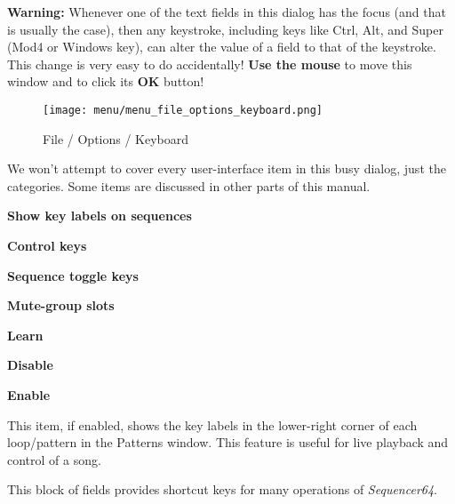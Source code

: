    \textbf{Warning:}
   Whenever one of the text fields in this dialog has the focus (and that is
   usually the case), then any keystroke, including keys like Ctrl, Alt,
   and Super (Mod4 or Windows key), can alter the value of a field to that
   of the keystroke.  This change is very easy to do accidentally!
   \textbf{Use the mouse}
   to move this window and to click its \textbf{OK} button!

\begin{figure}[H]
   \centering 
   \texttt{[image: menu/menu\_file\_options\_keyboard.png]}
   \caption{File / Options / Keyboard}
   \label{fig:seq64_menu_file_options_keyboard}
\end{figure}

   We won't attempt to cover every user-interface item in this busy
   dialog, just the categories.  Some items are discussed in other parts of
   this manual.

   \begin{enumber}
      \item \textbf{Show key labels on sequences}
      \item \textbf{Control keys}
      \item \textbf{Sequence toggle keys}
      \item \textbf{Mute-group slots}
      \item \textbf{Learn}
      \item \textbf{Disable}
      \item \textbf{Enable}
   \end{enumber}

   \setcounter{ItemCounter}{0}      %

   This item, if enabled, shows the key labels in the lower-right corner of
   each loop/pattern in the Patterns window.  This feature is useful
   for live playback and control of a song.

   This block of fields provides shortcut keys for many operations of
   \textsl{Sequencer64}.

